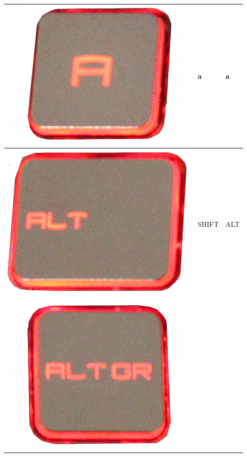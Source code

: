 \begin{longtable}{|cll|}
\begin{minipage}[c]{.3\textwidth}
\includegraphics[scale=0.06]{Images/KeyMapping/a}
\vspace{0.2cm}
\end{minipage} & a & a\\
\hline
\begin{minipage}[c]{.3\textwidth}
\vspace{0.2cm}
\includegraphics[scale=0.06]{Images/KeyMapping/ALT}
\vspace{0.2cm}
\end{minipage} & SHIFT & ALT\\
\hline
\begin{minipage}[c]{.3\textwidth}
\vspace{0.2cm}
\includegraphics[scale=0.06]{Images/KeyMapping/ALT_GR}

\end{minipage}
\end{longtable}
